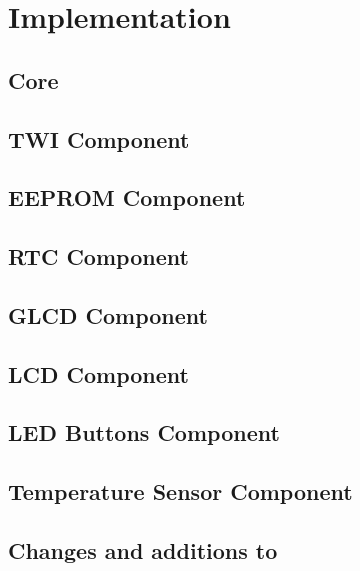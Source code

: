 
\chapter{Implementation} \label{chapter:implementation}

\section{Core}

\section{\acf{TWI} Component}

\section{\acf{EEPROM} Component}

\cite{microchip01}

\section{\acf{RTC} Component}

\cite{maxim01}

\section{\acf{GLCD} Component}

\cite{winstar01, samsung01, neotec01}

\section{\acf{LCD} Component}

\cite{hitachi01, samsung02, winstar02}

\section{\acf{LED} Buttons Component}

\section{Temperature Sensor Component}

\cite{maxim02}

\section{Changes and additions to \simavr}
